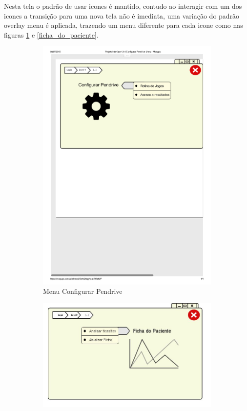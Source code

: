 \documentclass[12pt]{article}
\begin{document}
Nesta tela o padrão de usar icones é mantido, contudo ao interagir com um dos icones a transição para uma nova tela não é imediata, uma variação do padrão overlay menu é aplicada, trazendo um menu diferente para cada icone como nas figuras \ref{configurar_pendrive} e \ref{ficha_do_paciente}.

\begin{figure}[h]
\begin{subfigure}{0.5\textwidth}
\centering
\includegraphics[scale=0.3]{imagens/2-4Configurar_Pendrive_Menu.pdf}
\caption{Menu Configurar Pendrive}
\label{configurar_pendrive}
\end{subfigure}
\begin{subfigure}{0.5\textwidth}
\includegraphics[scale=0.3]{imagens/2-3Ficha_do_Paciente_Menu.jpg} 

\end{subfigure}
\end{figure}
\end{document}
